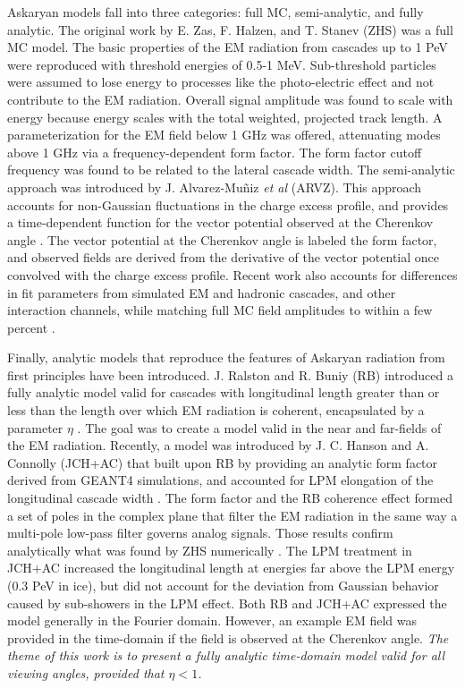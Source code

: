 \documentclass[amsmath,amssymb,aps,prd,10pt,twocolumn]{revtex4}
\begin{document}
Askaryan models fall into three categories: full MC, semi-analytic, and fully analytic.  The original work by E. Zas, F. Halzen, and T. Stanev (ZHS) \cite{zhs} was a full MC model.  The basic properties of the EM radiation from cascades up to 1 PeV were reproduced with threshold energies of 0.5-1 MeV.  Sub-threshold particles were assumed to lose energy to processes like the photo-electric effect and not contribute to the EM radiation.  Overall signal amplitude was found to scale with energy because energy scales with the total weighted, projected track length.  A parameterization for the EM field below 1 GHz was offered, attenuating modes above 1 GHz via a frequency-dependent form factor.  The form factor cutoff frequency was found to be related to the lateral cascade width.  The semi-analytic approach was introduced by J. Alvarez-Mu\~{n}iz \textit{et al} (ARVZ).  This approach accounts for non-Gaussian fluctuations in the charge excess profile, and provides a time-dependent function for the vector potential observed at the Cherenkov angle \cite{10.1103/physrevd.84.103003}.  The vector potential at the Cherenkov angle is labeled the form factor, and observed fields are derived from the derivative of the vector potential once convolved with the charge excess profile.  Recent work also accounts for differences in fit parameters from simulated EM and hadronic cascades, and other interaction channels, while matching full MC field amplitudes to within a few percent \cite{PhysRevD.101.083005}.

Finally, analytic models that reproduce the features of Askaryan radiation from first principles have been introduced.  J. Ralston and R. Buniy (RB) introduced a fully analytic model valid for cascades with longitudinal length greater than or less than the length over which EM radiation is coherent, encapsulated by a parameter $\eta$ \cite{10.1103/physrevd.65.016003}.  The goal was to create a model valid in the near and far-fields of the EM radiation.  Recently, a model was introduced by J. C. Hanson and A. Connolly (JCH+AC) that built upon RB by providing an analytic form factor derived from GEANT4 simulations, and accounted for LPM elongation of the longitudinal cascade width \cite{10.1016/j.astropartphys.2017.03.008}.  The form factor and the RB coherence effect formed a set of poles in the complex plane that filter the EM radiation in the same way a multi-pole low-pass filter governs analog signals.  Those results confirm analytically what was found by ZHS numerically \cite{zhs}.  The LPM treatment in JCH+AC increased the longitudinal length at energies far above the LPM energy (0.3 PeV in ice), but did not account for the deviation from Gaussian behavior caused by sub-showers in the LPM effect.  Both RB and JCH+AC expressed the model generally in the Fourier domain.  However, an example EM field was provided in the time-domain if the field is observed at the Cherenkov angle.  \textit{The theme of this work is to present a fully analytic time-domain model valid for all viewing angles, provided that $\eta < 1$.}
\end{document}
